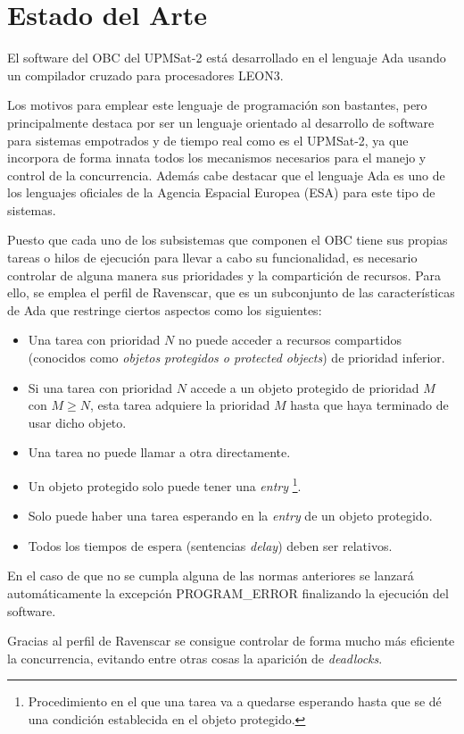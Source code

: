 
\chapter{Estado del Arte}
\label{chap:estado_del_arte}

El software del OBC del UPMSat-2 está desarrollado en el lenguaje Ada usando un
compilador cruzado para procesadores LEON3.

Los motivos para emplear este lenguaje de programación son bastantes, pero
principalmente destaca por ser un lenguaje orientado al desarrollo de software
para sistemas
empotrados y de tiempo real como es el UPMSat-2, ya que incorpora de forma
innata todos los mecanismos necesarios para el manejo y control de la
concurrencia. Además cabe destacar que el lenguaje Ada es
uno de los lenguajes oficiales de la Agencia Espacial Europea
(ESA\cite{web-ESA}) para este tipo de sistemas.

Puesto que cada uno de los subsistemas que componen el OBC tiene sus propias
tareas o hilos de ejecución para llevar a cabo su funcionalidad, es necesario
controlar de alguna manera sus prioridades y la compartición de recursos.
Para ello, se emplea el perfil de Ravenscar\cite{perfil-ravenscar},
que es un subconjunto de
las características de Ada que restringe ciertos aspectos como los siguientes:

\begin{itemize}
\item Una tarea con prioridad $N$ no puede acceder a recursos compartidos
  (conocidos como \textit{objetos protegidos o protected objects}) de prioridad
  inferior.
\item Si una tarea con prioridad $N$ accede a un objeto protegido
  de prioridad $M$
  con $M \geq N$, esta tarea adquiere la prioridad $M$ hasta que haya
  terminado de usar dicho objeto.
\item Una tarea no puede llamar a otra directamente.
\item Un objeto protegido solo puede tener una \textit{entry}
  \footnote{Procedimiento en el que una tarea va a quedarse esperando hasta que
  se dé una condición establecida en el objeto protegido.}.
\item Solo puede haber una tarea esperando en la \textit{entry} de un objeto
  protegido.
\item Todos los tiempos de espera (sentencias \textit{delay}) deben ser
  relativos.
\end{itemize}

En el caso de que no se cumpla alguna de las normas anteriores se lanzará
automáticamente la excepción PROGRAM\_ERROR finalizando la ejecución del
software.

Gracias al perfil de Ravenscar se consigue controlar de forma mucho más
eficiente la concurrencia, evitando entre otras cosas
la aparición de \textit{deadlocks}.

